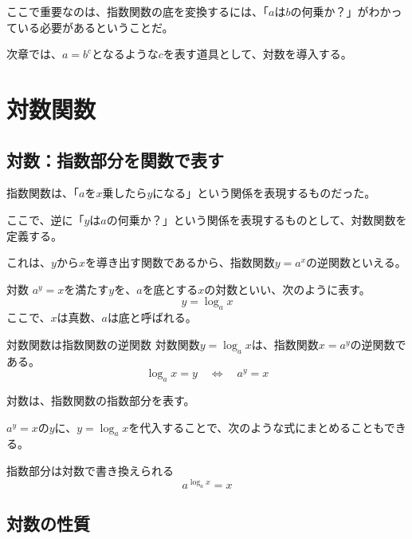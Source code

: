 \documentclass[../math-imaging]{subfiles}
\begin{document}
ここで重要なのは、指数関数の底を変換するには、「$a$は$b$の何乗か？」がわかっている必要があるということだ。

次章では、$a = b^c$となるような$c$を表す道具として、対数を導入する。

\section{対数関数}

\subsection{対数：指数部分を関数で表す}

指数関数は、「$a$を$x$乗したら$y$になる」という関係を表現するものだった。

ここで、逆に「$y$は$a$の何乗か？」という関係を表現するものとして、対数関数を定義する。

これは、$y$から$x$を導き出す関数であるから、指数関数$y=a^x$の逆関数といえる。

\begin{definition}{対数}
  \newline
  $a^y = x$を満たす$y$を、$a$を底とする$x$の対数といい、次のように表す。
  \LARGE
  \begin{equation}
    y = \log_a x
  \end{equation}
  \normalsize
  ここで、$x$は真数、$a$は底と呼ばれる。
\end{definition}

\begin{definition}{対数関数は指数関数の逆関数}
  \newline
  対数関数$y=\log_a x$は、指数関数$x = a^y$の逆関数である。
  \LARGE
  \begin{equation}
    \log_a x = y \quad \Longleftrightarrow  \quad a^y = x
  \end{equation}
\end{definition}

対数は、指数関数の指数部分を表す。

$a^y = x$の$y$に、$y=\log_a x$を代入することで、次のような式にまとめることもできる。

\begin{theorem}{指数部分は対数で書き換えられる}
  \LARGE
  \begin{equation}
    a^{\log_a x} = x
  \end{equation}
\end{theorem}

\subsection{対数の性質}
\end{document}
